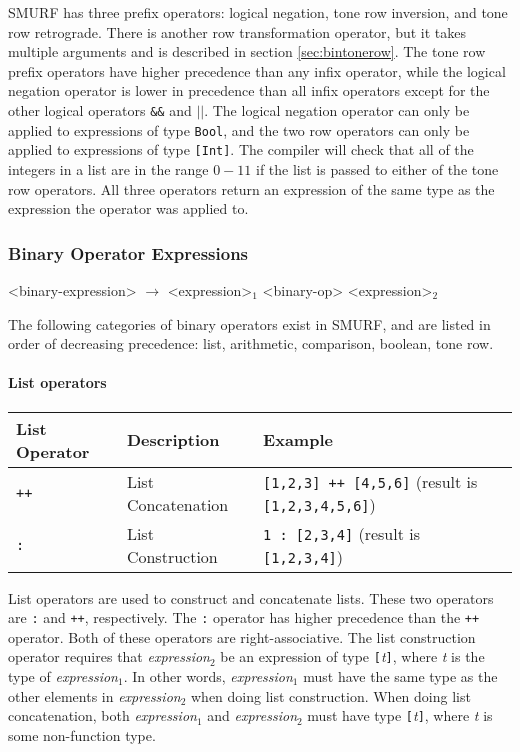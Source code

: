 SMURF has three prefix operators: logical negation, tone row inversion, and tone row retrograde.
There is another row transformation operator, but it takes multiple arguments and is described in
section \ref{sec:bintonerow}. The tone row prefix operators have higher precedence than any infix operator, while the logical negation operator
is lower in precedence than all infix operators except for the other logical operators \texttt{\&\&} and \texttt{$||$}.
The logical negation operator can only be applied to expressions of
type \texttt{Bool}, and the two row operators can only be applied to expressions of type
\texttt{[Int]}. The compiler will check that all of the integers in a list are in the range $0-11$
if the list is passed to either of the tone row operators.
All three operators return an expression of the same type as the expression the
operator was applied to.

\subsubsection{Binary Operator Expressions}
\label{sec:binaryop}
\begin{grammar}
<binary-expression> $\rightarrow$ <expression>$_1$ <binary-op> <expression>$_2$
\end{grammar}
The following categories of binary operators exist in SMURF, and are listed in order of decreasing
precedence: list, arithmetic, comparison, boolean, tone row. 

\paragraph{List operators}

\begin{table} [H]
\centering
\begin{tabular}{lll}
\hline\hline
List Operator & Description & Example \\
\hline\hline
   \texttt{++} & List Concatenation & \texttt{[1,2,3] ++ [4,5,6]} (result is \texttt{[1,2,3,4,5,6]}) \\ \hline
   \texttt{:} & List Construction & \texttt{1 : [2,3,4]} (result is \texttt{[1,2,3,4]}) \\ \hline
\end{tabular}
\end{table}

List operators are used to construct and concatenate lists. 
These two operators are \texttt{:} and \texttt{++}, respectively. The \texttt{:} operator has 
higher precedence than the \texttt{++} operator. Both of these operators are right-associative.
The list construction operator requires that  \emph{expression$_{2}$} be an expression of type 
\texttt{[}\emph{t}\texttt{]}, where \emph{t} is the type of \emph{expression$_{1}$}. 
In other words, \emph{expression$_{1}$} must have the same type 
as the other elements in \emph{expression$_{2}$} when doing list construction.
When doing list concatenation, both
\emph{expression$_{1}$} and \emph{expression$_{2}$} must have type \texttt{[}\emph{t}\texttt{]},
where \emph{t} is some non-function type. 

